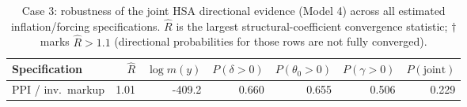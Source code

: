 \begin{table}[H]\centering\small
\caption{Case 3: robustness of the joint HSA directional evidence (Model 4) across all estimated inflation/forcing specifications. $\hat R$ is the largest structural-coefficient convergence statistic; $\dagger$ marks $\hat R>1.1$ (directional probabilities for those rows are not fully converged).}
\label{tab:case3_robust}
\footnotesize\setlength{\tabcolsep}{4.5pt}
\begin{tabular}{@{}lrrrrrr@{}}\toprule
Specification & $\hat R$ & $\log m(y)$ & $P(\delta{>}0)$ & $P(\theta_0{>}0)$ & $P(\gamma{>}0)$ & $P(\text{joint})$ \\\midrule
PPI / inv.\ markup & 1.01 & -409.2 & 0.660 & 0.655 & 0.506 & 0.229 \\
\bottomrule\end{tabular}\end{table}
